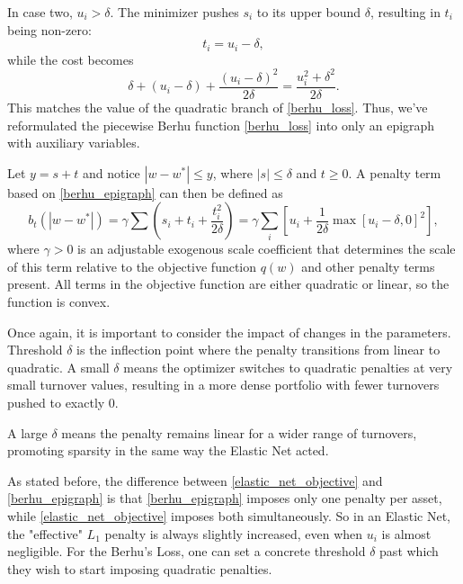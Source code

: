 \documentclass[11pt, letterpaper]{article}
\begin{document}
In case two, $u_i > \delta$. The minimizer pushes $s_i$ to its upper bound $\delta$, resulting in $t_i$ being non-zero:
\begin{equation*}
	t_i = u_i - \delta,
\end{equation*}
while the cost becomes
\begin{equation*}
	\delta + (u_i - \delta) + \frac{(u_i - \delta)^2}{2\delta} = \frac{u_i^2 + \delta ^ 2}{2\delta}.
\end{equation*}
This matches the value of the quadratic branch of \eqref{berhu_loss}. Thus, we've reformulated the piecewise Berhu function
\eqref{berhu_loss} into only an epigraph with auxiliary variables.

Let $y = s + t$ and notice $|w - w^*| \leq y$, where $|s| \leq \delta$ and $t \geq 0$. A penalty term based on
\eqref{berhu_epigraph} can then be defined as
\begin{equation}
	b_t(|w - w^*|) = \gamma \sum \left(s_i + t_i + \frac{t_i^2}{2\delta}\right) = \gamma \sum_i{\left[u_i + \frac{1}{2\delta}\max[u_i - \delta, 0]^2\right]},
\end{equation}
where $\gamma > 0$ is an adjustable exogenous scale coefficient that determines the scale of this term relative to the objective
function $q(w)$ and other penalty terms present. All terms in the objective function are either quadratic or linear, so the
function is convex.

Once again, it is important to consider the impact of changes in the parameters. Threshold $\delta$ is the inflection point where the
penalty transitions from linear to quadratic. A small $\delta$ means the optimizer switches to quadratic penalties at very small turnover values,
resulting in a more dense portfolio with fewer turnovers pushed to exactly $0$.

A large $\delta$ means the penalty remains linear for a wider range of turnovers, promoting sparsity in the same way the Elastic Net acted.

As stated before, the difference between \eqref{elastic_net_objective} and \eqref{berhu_epigraph} is that \eqref{berhu_epigraph} imposes only one penalty per asset,
while \eqref{elastic_net_objective} imposes both simultaneously. So in an Elastic Net, the "effective" $L_1$ penalty is always slightly increased, even when
$u_i$ is almost negligible. For the Berhu's Loss, one can set a concrete threshold $\delta$ past which they wish to start imposing quadratic penalties.

\end{document}
